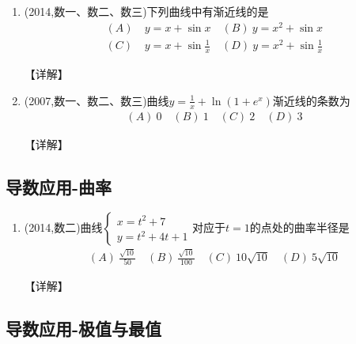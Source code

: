 \documentclass[12pt, a4paper, oneside, UTF8]{ctexbook}
\begin{document}
\begin{enumerate}[label=\arabic*.,start=13]
    \item  (2014,数一、数二、数三)下列曲线中有渐近线的是
    \begin{align*}
        (A)&\ y=x+\sin x \quad (B)\ y=x^2+\sin x \\
        (C)&\ y=x+\sin\frac{1}{x} \quad (D)\ y=x^2+\sin\frac{1}{x}
    \end{align*}
    
    \begin{solution}
    【详解】
    \end{solution}
    
    \item  (2007,数一、数二、数三)曲线$y=\frac{1}{x}+\ln(1+e^x)$渐近线的条数为
    \begin{align*}
        (A)\ 0 \quad (B)\ 1 \quad (C)\ 2 \quad (D)\ 3
    \end{align*}
    
    \begin{solution}
    【详解】
    \end{solution}
\end{enumerate}

\subsection{导数应用-曲率}

\begin{enumerate}[label=\arabic*.,start=15]
    \item  (2014,数二)曲线$\begin{cases}
        x=t^2+7 \\
        y=t^2+4t+1
    \end{cases}$对应于$t=1$的点处的曲率半径是
    \begin{align*}
        (A)\ \frac{\sqrt{10}}{50} \quad (B)\ \frac{\sqrt{10}}{100} \quad (C)\ 10\sqrt{10} \quad (D)\ 5\sqrt{10}
    \end{align*}
    
    \begin{solution}
    【详解】
    \end{solution}
\end{enumerate}

\subsection{导数应用-极值与最值}
\end{document}
